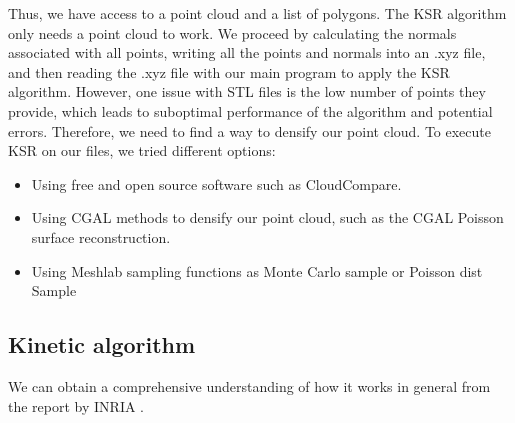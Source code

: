 \documentclass{article}
\begin{document}
Thus, we have access to a point cloud and a list of polygons. The KSR algorithm only needs a point cloud to work. We proceed by calculating the normals associated with all points, 
writing all the points and normals into an .xyz file, and then reading the .xyz file with our main program to apply the KSR algorithm.
However, one issue with STL files is the low number of points they provide, which leads to suboptimal performance of the algorithm and potential errors. Therefore, we need to find a way to densify our point cloud.
To execute KSR on our files, we tried different options:

\begin{itemize}
  \item Using free and open source software such as CloudCompare.
  \item Using CGAL methods to densify our point cloud, such as the CGAL Poisson surface reconstruction.
  \item Using Meshlab sampling functions as Monte Carlo sample or Poisson dist Sample
\end{itemize}


\subsection{Kinetic algorithm}
We can obtain a comprehensive understanding of how it works in general from the report by INRIA \cite{yu:hal-03621896}.
\end{document}
